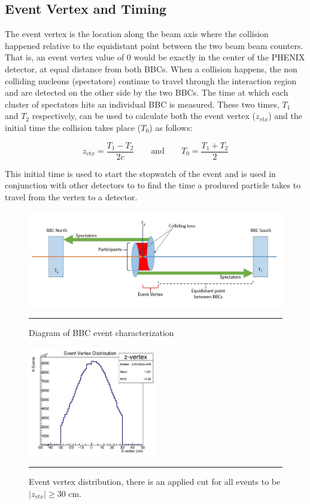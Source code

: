 \subsection{Event Vertex and Timing}
The event vertex is the location along the beam axis where the collision happened relative to the equidistant point between the two beam beam counters. That is, an event vertex value of 0 would be exactly in the center of the PHENIX detector, at equal distance from both BBCs. When a collision happens, the non colliding nucleons (spectators) continue to travel through the interaction region and are detected on the other side by the two BBCs. The time at which each cluster of spectators hits an individual BBC is measured. These two times, $T_1$ and $T_2$ respectively, can be used to calculate both the event vertex ($z_{vtx}$) and the initial time the collision takes place ($T_0$) as follows\citep{Mitchell:2002wu}:

\begin{equation}
 z_{vtx} = \frac{T_1 - T_2}{2c} \qquad\text{and}\qquad T_0 = \frac{T_1 + T_2}{2}
\end{equation}

This initial time is used to start the stopwatch of the event and is used in conjunction with other detectors to to find the time a produced particle takes to travel from the vertex to a detector.

\begin{figure}[htbp!]
  \centering
    \includegraphics[width=1\textwidth]{Figures/BBCevtchar.JPG}
    \rule{35em}{0.5pt}
  \caption[Diagram of BBC event characterization]{Diagram of BBC event characterization}
  \label{fig:bbcvtx}
\end{figure}


\begin{figure}[htbp!]
  \centering
    \includegraphics[width=0.5\textwidth]{evtQA/zvtxdist.JPG}
    \rule{35em}{0.5pt}
  \caption[Event Vertex Distribution]{Event vertex distribution, there is an applied cut for all events to be $|z_{vtx}| \geq 30$ cm.}
  \label{fig:vtxdist}
\end{figure}


